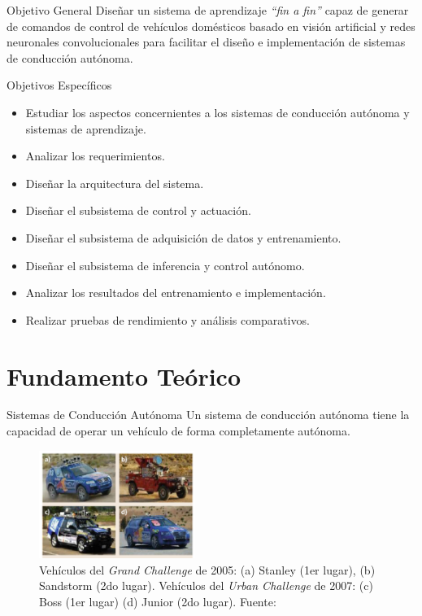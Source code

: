 \documentclass[10pt]{beamer}
\begin{document}
\begin{frame}{Objetivo General}
    Diseñar un sistema de aprendizaje \emph{“fin a fin”} capaz de generar de comandos de 
control de vehículos domésticos basado en visión artificial y \alert{redes neuronales 
convolucionales} para facilitar el diseño e implementación de sistemas de conducción autónoma.
\end{frame}

\begin{frame}{Objetivos Específicos}
    \begin{itemize}

        \item Estudiar los aspectos concernientes a los sistemas de conducción autónoma y sistemas de aprendizaje.
        \item Analizar los requerimientos.
        \item Diseñar la arquitectura del sistema.
        \item Diseñar el subsistema de control y actuación.
        \item Diseñar el subsistema de adquisición de datos y entrenamiento.
        \item Diseñar el subsistema de inferencia y control autónomo.
        \item Analizar los resultados del entrenamiento e implementación.
        \item Realizar pruebas de rendimiento y análisis comparativos.
    
    \end{itemize}
\end{frame}


\section{Fundamento Teórico}

\begin{frame}{Sistemas de Conducción Autónoma}
    Un sistema de conducción autónoma tiene la capacidad de operar un vehículo 
    de forma completamente autónoma.
    \begin{figure}[!h] 
        \centering
        \includegraphics[width=0.45\textwidth]{../img/darpa}
        \caption[Vehículos del \textit{Grand Challenge}]{Vehículos del \textit{Grand Challenge} de 2005: (a) Stanley (1er lugar), (b) Sandstorm (2do lugar). Vehículos del \textit{Urban Challenge} de 2007: (c) Boss (1er lugar) (d) Junior (2do lugar). Fuente: \cite{wikipedia_2018} }
    \end{figure}
\end{frame}
\end{document}
